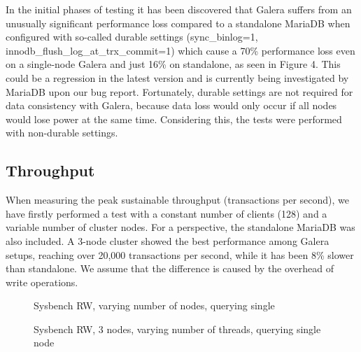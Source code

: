 \documentclass{sig-alternate}
\begin{document}
In the initial phases of testing it has been discovered that Galera suffers from an unusually significant performance loss compared to a standalone MariaDB when configured with so-called durable settings (sync\_binlog=1, innodb\_flush\_log\_at\_trx\_commit=1) which cause a 70\% performance loss even on a single-node Galera and just 16\% on standalone, as seen in Figure 4. This could be a regression in the latest version and is currently being investigated by MariaDB upon our bug report. Fortunately, durable settings are not required for data consistency with Galera, because data loss would only occur if all nodes would lose power at the same time. Considering this, the tests were performed with non-durable settings.

\subsection{Throughput}

When measuring the peak sustainable throughput (transactions per second), we have firstly performed a test with a constant number of clients (128) and a variable number of cluster nodes. For a perspective, the standalone MariaDB was also included. A 3-node cluster showed the best performance among Galera setups, reaching over 20,000 transactions per second, while it has been 8\% slower than standalone. We assume that the difference is caused by the overhead of write operations.

\begin{figure}[h]
\centering
{}
\caption{Sysbench RW, varying number of nodes, querying single}
\end{figure}

\begin{figure}[h]
\centering
{}
\caption{Sysbench RW, 3 nodes, varying number of threads, querying single node}
\end{figure}
\end{document}
